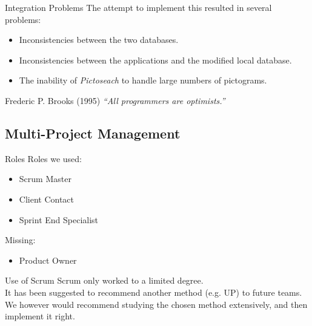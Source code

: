 \begin{frame}{Integration Problems}
	The attempt to implement this resulted in several problems:
	\begin{itemize}
		\item Inconsistencies between the two databases.
		\item Inconsistencies between the applications and the modified local database.
		\item The inability of \textit{Pictoseach} to handle large numbers of pictograms.
	\end{itemize}

	\begin{block}{Frederic P. Brooks (1995)}
    	\textit{``All programmers are optimists.''}
   	\end{block}
\end{frame}


\subsection{Multi-Project Management}

\begin{frame}{Roles}
	Roles we used:
	\begin{itemize}
		\item Scrum Master
		\item Client Contact
		\item Sprint End Specialist
	\end{itemize}
	Missing:
	\begin{itemize}
		\item Product Owner
	\end{itemize}
\end{frame}

\begin{frame}{Use of Scrum}
	Scrum only worked to a limited degree.\\
	\vspace{\baselineskip}
	It has been suggested to recommend another method (e.g. UP) to future teams.\\
	\vspace{\baselineskip}
	We however would recommend studying the chosen method extensively, and then implement it right.
\end{frame}

